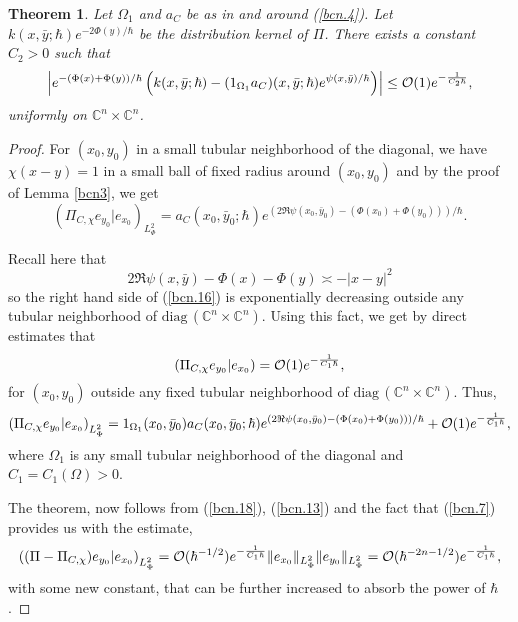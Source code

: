 \documentclass{article}
\newtheorem{theo}{Theorem}[section]
\newcommand{\CM}{\mathbb{C}}
\newcommand{\h}{\hbar}
\newcommand{\pscal}[2]{\left(#1 | #2\right)}
\begin{document}
\begin{theo}\label{bcn4}
  Let $\Omega _1$ and $a_C$ be as in and around (\ref{bcn.4}). Let
  $k(x,\bar{y};\h)e^{-2\Phi (y)/\h}$ be the distribution kernel of
  $\Pi $. There exists a constant $C_2>0$ such that
  \begin{equation}\label{bcn.14}
    \left| 
      e^{-(\Phi (x)+\Phi (y))/\h}\left(
        k(x,\bar{y};\h)-(1_{\Omega _1}a_C)(x,\bar{y};\h) 
        e^{\psi (x,\bar{y})/\h} \right)
    \right| 
    \le {\cal O}(1)e^{-\frac{1}{C_2\h}},
  \end{equation}
  uniformly on $\CM^n\times \CM^n$.
\end{theo}
\begin{proof}
  For $(x_0,y_0)$ in a small tubular neighborhood of the diagonal, we
  have $\chi (x-y)=1$ in a small ball of fixed radius around
  $(x_0,y_0)$ and by the proof of Lemma \ref{bcn3}, we get
  \begin{equation}\label{bcn.16}
    \pscal{\Pi _{C,\chi }e_{y_0}}{e_{x_0}}_{L^2_{\Phi}} = 
    a_C(x_0,\bar{y}_0;\h)e^{(2\Re \psi (x_0,\bar{y}_0) - 
      (\Phi(x_0)+\Phi (y_0)))/\h}.
  \end{equation}

  Recall here that
  \[
  2 \Re \psi (x,\bar{y})-\Phi (x)-\Phi (y)\asymp -|x-y|^2
  \]
  so the right hand side of (\ref{bcn.16}) is exponentially decreasing
  outside any tubular neighborhood of
  $\mathrm{diag\,}(\CM^n\times \CM^n)$. Using this fact, we get by
  direct estimates that
  \begin{equation}\label{bcn.17}
    \pscal{\Pi _{C,\chi }e_{y_0}}{e_{x_0}}
    ={\cal O}(1)e^{-\frac{1}{C_1\h}},
  \end{equation}
  for $(x_0,y_0)$ outside any fixed tubular neighborhood of
  $\mathrm{diag\,}(\CM^n\times \CM^n)$. Thus,
  \begin{equation}\label{bcn.18}
    \pscal{\Pi _{C,\chi }e_{y_0}}{e_{x_0}}_{L^2_{\Phi
      }}=1_{\Omega _1}(x_0,\bar{y}_0)a_C(x_0,\bar{y}_0;\h)
    e^{(2\Re \psi (x_0,\bar{y}_0)-(\Phi
      (x_0)+\Phi (y_0)))/\h}+{\cal O}(1)e^{-\frac{1}{C_1\h}},
  \end{equation}
  where $\Omega _1$ is any small tubular neighborhood of the diagonal
  and $C_1=C_1(\Omega )>0$.

  The theorem, now follows from (\ref{bcn.18}), (\ref{bcn.13}) and the
  fact that (\ref{bcn.7}) provides us with the estimate,
  \[
  \pscal{ (\Pi -\Pi _{C,\chi })e_{y_0}}{e_{x_0}}_{L^2_\Phi }={\cal
    O}(\h^{-1/2})e^{-\frac{1}{C_1\h}}\| e_{x_0}\|_{L^2_\Phi } \|
  e_{y_0}\|_{L^2_\Phi } = {\cal O}(\h^{-2n-1/2})e^{-\frac{1}{C_1\h}},
  \]
  with some new constant, that can be further increased to absorb the
  power of $\h$.
\end{proof}
\end{document}
